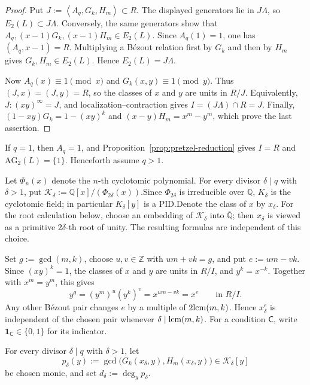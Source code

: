 \documentclass{article}
\theoremstyle{definition}
\theoremstyle{plain}
\newcommand{\Q}{{\mathbb{Q}}}
\DeclareMathOperator{\gcdop}{gcd}
\newcommand{\lcm}{{\rm lcm}}
\newcommand{\ideal}[1]{\left\langle #1 \right\rangle}
\newcommand{\AG}{\mathrm{AG}}
\newcommand{\Z}{\mathbb{Z}}
\begin{document}
\begin{proof}
Put \(J:=\ideal{A_q,G_k,H_m}\subset R\).  The displayed generators lie
in \(J\Lambda\), so \(E_2(L)\subset J\Lambda\).  Conversely, the same
generators show that
\(A_q,(x-1)G_k,(x-1)H_m\in E_2(L)\).  Since \(A_q(1)=1\), one has
\((A_q,x-1)=R\).  Multiplying a B\'ezout relation first by \(G_k\) and then
by \(H_m\) gives \(G_k,H_m\in E_2(L)\).  Hence
\(E_2(L)=J\Lambda\).

Now \(A_q(x)\equiv1\pmod{x}\) and \(G_k(x,y)\equiv1\pmod{y}\).  Thus
\((J,x)=(J,y)=R\), so the classes of \(x\) and \(y\) are units in
\(R/J\).  Equivalently,
\(J:(xy)^\infty=J\), and localization--contraction gives
\(I=(J\Lambda)\cap R=J\).  Finally,
\((1-xy)G_k=1-(xy)^k\) and \((x-y)H_m=x^m-y^m\), which prove the
last assertion.
\end{proof}
If \(q=1\), then \(A_q=1\), and
Proposition~\ref{prop:pretzel-reduction} gives \(I=R\) and
\(\AG_2(L)=\{1\}\).  Henceforth assume \(q>1\).

Let \(\Phi_n(x)\) denote the \(n\)-th cyclotomic polynomial.  For every
divisor \(\delta\mid q\) with \(\delta>1\), put
\(\mathcal K_\delta:=\Q[x]/(\Phi_{2\delta}(x))\).Since $\Phi_{2\delta}$ is irreducible over $\mathbb{Q}$, $K_\delta$ is the cyclotomic field; in particular $K_\delta[y]$ is a PID.Denote the class
of \(x\) by \(x_\delta\).  For the root calculation
below, choose an embedding of \(\mathcal K_\delta\) into
\(\overline{\Q}\); then \(x_\delta\) is viewed as a primitive
\(2\delta\)-th root of unity.  The resulting formulas are independent of
this choice.

Set \(g:=\gcdop(m,k)\), choose \(u,v\in\Z\) with \(um+vk=g\), and
put \(e:=um-vk\).
Since \((xy)^k=1\), the classes of \(x\) and \(y\) are units in
\(R/I\), and \(y^k=x^{-k}\).  Together with \(x^m=y^m\), this gives
\[
y^g=(y^m)^u(y^k)^v=x^{um-vk}=x^e
\qquad\text{in }R/I.
\]
Any other B\'ezout pair changes \(e\) by a multiple of
\(2\lcm(m,k)\).  Hence \(x_\delta^e\) is independent of the chosen pair
whenever \(\delta\mid\lcm(m,k)\).  For a condition \(\mathsf C\), write
\(\mathbf 1_{\mathsf C}\in\{0,1\}\) for its indicator.

For every divisor \(\delta\mid q\) with \(\delta>1\), let
\[
p_\delta(y):=
\gcdop\bigl(G_k(x_\delta,y),H_m(x_\delta,y)\bigr)
\in\mathcal K_\delta[y]
\]
be chosen monic, and set \(d_\delta:=\deg_y p_\delta\).
\end{document}
